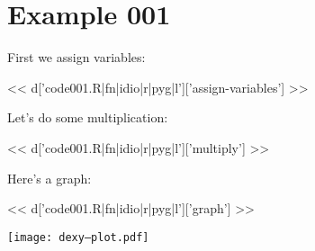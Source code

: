 \section{Example 001}

First we assign variables:

<< d['code001.R|fn|idio|r|pyg|l']['assign-variables'] >>

Let's do some multiplication:

<< d['code001.R|fn|idio|r|pyg|l']['multiply'] >>

Here's a graph:

<< d['code001.R|fn|idio|r|pyg|l']['graph'] >>

\texttt{[image: dexy--plot.pdf]}

